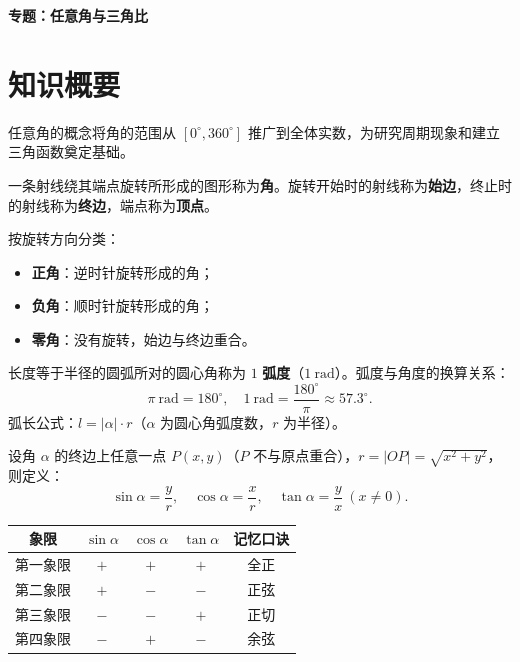 \documentclass[11pt]{ctexrep}
\begin{document}
\begin{center}
    {\Large\bfseries 专题：任意角与三角比}
\end{center}

\section*{知识概要}

任意角的概念将角的范围从 $[0^{\circ}, 360^{\circ}]$ 推广到全体实数，为研究周期现象和建立三角函数奠定基础。

\begin{definition}[任意角]
    一条射线绕其端点旋转所形成的图形称为\textbf{角}。旋转开始时的射线称为\textbf{始边}，终止时的射线称为\textbf{终边}，端点称为\textbf{顶点}。
    
    按旋转方向分类：
    \begin{itemize}
        \item \textbf{正角}：逆时针旋转形成的角；
        \item \textbf{负角}：顺时针旋转形成的角；
        \item \textbf{零角}：没有旋转，始边与终边重合。
    \end{itemize}
\end{definition}

\begin{definition}[弧度制]
    长度等于半径的圆弧所对的圆心角称为 $1$ \textbf{弧度}（$1\ \mathrm{rad}$）。弧度与角度的换算关系：
    \[
        \pi\ \mathrm{rad} = 180^{\circ}, \quad 1\ \mathrm{rad} = \frac{180^{\circ}}{\pi} \approx 57.3^{\circ}.
    \]
    弧长公式：$l = |\alpha| \cdot r$（$\alpha$ 为圆心角弧度数，$r$ 为半径）。
\end{definition}

\begin{definition}[三角比的定义]
    设角 $\alpha$ 的终边上任意一点 $P(x, y)$（$P$ 不与原点重合），$r = |OP| = \sqrt{x^2 + y^2}$，则定义：
    \[
        \sin\alpha = \frac{y}{r}, \quad \cos\alpha = \frac{x}{r}, \quad \tan\alpha = \frac{y}{x}\ (x \neq 0).
    \]
\end{definition}

\begin{property}[各象限三角比的符号]
    \begin{center}
        \begin{tabular}{c|cccc}
            \hline
            象限 & $\sin\alpha$ & $\cos\alpha$ & $\tan\alpha$ & 记忆口诀 \\
            \hline
            第一象限 & $+$ & $+$ & $+$ & 全正 \\
            第二象限 & $+$ & $-$ & $-$ & 正弦 \\
            第三象限 & $-$ & $-$ & $+$ & 正切 \\
            第四象限 & $-$ & $+$ & $-$ & 余弦 \\
            \hline
        \end{tabular}
    \end{center}
\end{property}
\end{document}
